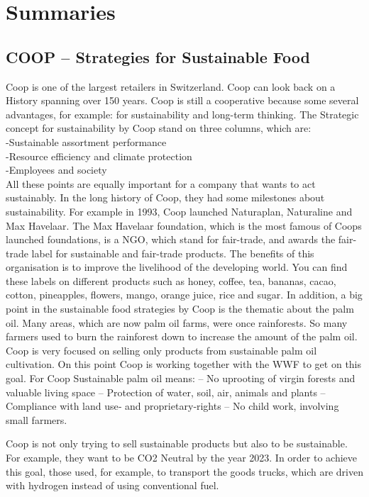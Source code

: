 \section{Summaries}
\subsection{COOP – Strategies for Sustainable Food}

Coop is one of the largest retailers in Switzerland. Coop can look back on a History spanning over 150 years. Coop is still a cooperative because some several advantages, for example: for sustainability and long-term thinking. The Strategic concept for sustainability by Coop stand on three columns, which are:\\

-Sustainable assortment performance\\
-Resource efficiency and climate protection\\
-Employees and society\\

All these points are equally important for a company that wants to act sustainably.
In the long history of Coop, they had some milestones about sustainability. For example in 1993, Coop launched Naturaplan, Naturaline and Max Havelaar. 
The Max Havelaar foundation, which is the most famous of Coops launched foundations, is a NGO, which stand for fair-trade, and awards the fair-trade label for sustainable and fair-trade products. The benefits of this organisation is to improve the livelihood of the developing world. You can find these labels on different products such as honey, coffee, tea, bananas, cacao, cotton, pineapples, flowers, mango, orange juice, rice and sugar.
In addition, a big point in the sustainable food strategies by Coop is the thematic about the palm oil. Many areas, which are now palm oil farms, were once rainforests. So many farmers used to burn the rainforest down to increase the amount of the palm oil. Coop is very focused on selling only products from sustainable palm oil cultivation. On this point Coop is working together with the WWF to get on this goal.
For Coop Sustainable palm oil means:
– No uprooting of virgin forests and valuable living space
– Protection of water, soil, air, animals and plants
– Compliance with land use‐ and proprietary‐rights
– No child work, involving small farmers.

Coop is not only trying to sell sustainable products but also to be sustainable. For example, they want to be CO2 Neutral by the year 2023. 
In order to achieve this goal, those used, for example, to transport the goods trucks, which are driven with hydrogen instead of using conventional fuel. 

